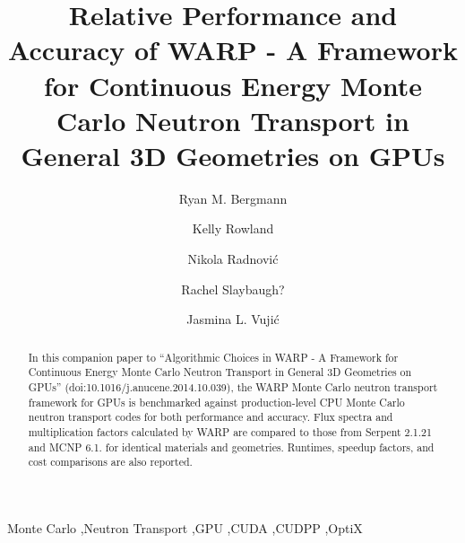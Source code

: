 \documentclass[preprint,12pt]{elsarticle}
\begin{document}
\begin{frontmatter}



\title{Relative Performance and Accuracy of WARP - A Framework for Continuous Energy Monte Carlo Neutron Transport in General 3D Geometries on GPUs}


\author{Ryan M. Bergmann }

\author{Kelly Rowland }

\author{Nikola Radnovi\'c }

\author{Rachel Slaybaugh?}

\author{Jasmina L. Vuji\'c }


\address{Department of Nuclear Engineering, 
4155 Etcheverry Hall, 
University of California - Berkeley,
Berkeley, CA 94703-1730}

\begin{abstract}

In this companion paper to ``Algorithmic Choices in WARP - A Framework for Continuous Energy Monte Carlo Neutron Transport in General 3D Geometries on GPUs'' (doi:10.1016/j.anucene.2014.10.039), the WARP Monte Carlo neutron transport framework for GPUs is benchmarked against production-level CPU Monte Carlo neutron transport codes for both performance and accuracy.  Flux spectra and multiplication factors calculated by WARP are compared to those from Serpent 2.1.21 and MCNP 6.1. for identical materials and geometries.  Runtimes, speedup factors, and cost comparisons are also reported.

\end{abstract}

\begin{keyword}
Monte Carlo \sep Neutron Transport \sep GPU \sep CUDA \sep CUDPP \sep OptiX


\end{keyword}

\end{frontmatter}
\end{document}
